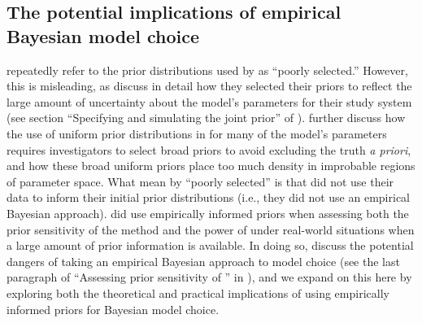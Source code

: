 \documentclass[letterpaper,12pt]{article}
\begin{document}
\begin{linenumbers}
\section*{The potential implications of empirical Bayesian model choice}
\citet{Hickerson2013} repeatedly refer to the prior distributions used by
\citet{Oaks2012} as ``poorly selected.''
However, this is misleading, as \citet{Oaks2012} discuss in detail how they
selected their priors to reflect the large amount of uncertainty about the
model's parameters for their study system (see section ``Specifying and
simulating the joint prior'' of \citet{Oaks2012}).
\citet{Oaks2012} further discuss how the use of uniform prior distributions in
\msb for many of the model's parameters requires investigators to select broad
priors to avoid excluding the truth \textit{a priori}, and how these broad
uniform priors place too much density in improbable regions of parameter space.
What \citet{Hickerson2013} mean by ``poorly selected'' is that
\citet{Oaks2012} did not use their data to inform their initial prior
distributions (i.e., they did not use an empirical Bayesian approach).
\citet{Oaks2012} did use empirically informed priors when assessing both the
prior sensitivity of the method and the power of \msb under real-world
situations when a large amount of prior information is available. 
In doing so, \citet{Oaks2012} discuss the potential dangers of taking an
empirical Bayesian approach to model choice (see the last paragraph of
``Assessing prior sensitivity of \msb'' in \citet{Oaks2012}), and we expand on
this here by exploring both the theoretical and practical implications of using
empirically informed priors for Bayesian model choice.


\end{linenumbers}
\end{document}
